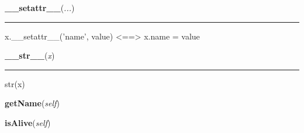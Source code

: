     \begin{boxedminipage}{\textwidth}

    \raggedright \textbf{\_\_setattr\_\_}(\textit{...})

    \vspace{-1.5ex}

    \rule{\textwidth}{0.5\fboxrule}
    x.\_\_setattr\_\_('name', value) {\textless}=={\textgreater} x.name = 
    value

    \vspace{1ex}

    \end{boxedminipage}

    \label{object:__str__}

    \vspace{0.5ex}

    \begin{boxedminipage}{\textwidth}

    \raggedright \textbf{\_\_str\_\_}(\textit{x})

    \vspace{-1.5ex}

    \rule{\textwidth}{0.5\fboxrule}
    str(x)

    \vspace{1ex}

    \end{boxedminipage}

    \label{threading:Thread:getName}

    \vspace{0.5ex}

    \begin{boxedminipage}{\textwidth}

    \raggedright \textbf{getName}(\textit{self})

    \end{boxedminipage}

    \label{threading:Thread:isAlive}

    \vspace{0.5ex}

    \begin{boxedminipage}{\textwidth}

    \raggedright \textbf{isAlive}(\textit{self})

    \end{boxedminipage}

